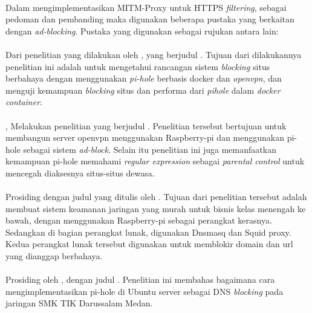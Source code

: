 \documentclass[../PROPOSAL_PRA_SKRIPSI_ALDZIKRI_DWIJAYANTO_PRATHAMA.tex]{subfiles}
\begin{document}
  \paragraph*{}Dalam mengimplementasikan MITM-Proxy untuk
  HTTPS \textit{filtering}, sebagai pedoman dan pembanding
  maka digunakan beberapa pustaka yang berkaitan dengan
  \textit{ad-blocking}. Pustaka yang digunakan sebagai
  rujukan antara lain:

  \paragraph*{} Dari penelitian yang dilakukan oleh
  \cite{uni2021}, yang berjudul .
  Tujuan dari dilakukannya penelitian ini adalah untuk
  mengetahui rancangan sistem \textit{blocking} situs
  berbahaya dengan menggunakan \textit{pi-hole} berbasis
  docker dan \textit{openvpn}, dan menguji kemampuan
  \textit{blocking} situs dan performa dari \textit{pihole}
  dalam \textit{docker container}.

  \paragraph*{} \cite{yusoff2020}, Melakukan penelitian yang
  berjudul \textit{}. Penelitian
  tersebut bertujuan untuk membangun server openvpn
  menggunakan Raspberry-pi dan menggunakan pi-hole sebagai
  sistem \textit{ad-block}. Selain itu penelitian ini juga
  memanfaatkan kemampuan pi-hole memahami \textit{regular
  expression} sebagai \textit{parental control} untuk
  mencegah diaksesnya situs-situs dewasa.

  \paragraph*{} Prosiding dengan judul
  \textit{}yang ditulis oleh
  \cite{sarath2020}. Tujuan dari penelitian tersebut adalah
  membuat sistem keamanan jaringan yang murah untuk bisnis
  kelas menengah ke bawah, dengan menggunakan Raspberry-pi
  sebagai perangkat kerasnya. Sedangkan di bagian perangkat
  lunak, digunakan Dnsmasq dan Squid proxy. Kedua perangkat
  lunak tersebut digunakan untuk memblokir domain dan url
  yang dianggap berbahaya.

  \paragraph*{} Prosiding oleh \cite{wahyudi2020}, dengan
  judul . Penelitian ini membahas
  bagaimana cara mengimplementasikan pi-hole di Ubuntu
  server sebagai DNS \textit{blocking} pada jaringan SMK TIK
  Darussalam Medan.
\end{document}
